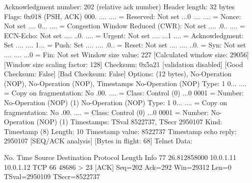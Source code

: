     Acknowledgment number: 202    (relative ack number)
    Header length: 32 bytes
    Flags: 0x018 (PSH, ACK)
        000. .... .... = Reserved: Not set
        ...0 .... .... = Nonce: Not set
        .... 0... .... = Congestion Window Reduced (CWR): Not set
        .... .0.. .... = ECN-Echo: Not set
        .... ..0. .... = Urgent: Not set
        .... ...1 .... = Acknowledgment: Set
        .... .... 1... = Push: Set
        .... .... .0.. = Reset: Not set
        .... .... ..0. = Syn: Not set
        .... .... ...0 = Fin: Not set
    Window size value: 227
    [Calculated window size: 29056]
    [Window size scaling factor: 128]
    Checksum: 0x5a21 [validation disabled]
        [Good Checksum: False]
        [Bad Checksum: False]
    Options: (12 bytes), No-Operation (NOP), No-Operation (NOP), Timestamps
        No-Operation (NOP)
            Type: 1
                0... .... = Copy on fragmentation: No
                .00. .... = Class: Control (0)
                ...0 0001 = Number: No-Operation (NOP) (1)
        No-Operation (NOP)
            Type: 1
                0... .... = Copy on fragmentation: No
                .00. .... = Class: Control (0)
                ...0 0001 = Number: No-Operation (NOP) (1)
        Timestamps: TSval 8522737, TSecr 2950107
            Kind: Timestamp (8)
            Length: 10
            Timestamp value: 8522737
            Timestamp echo reply: 2950107
    [SEQ/ACK analysis]
        [Bytes in flight: 68]
Telnet
    Data: 

No.     Time           Source                Destination           Protocol Length Info
     77 26.812858000   10.0.1.11             10.0.1.12             TCP      66     48686 > 23 [ACK] Seq=202 Ack=292 Win=29312 Len=0 TSval=2950109 TSecr=8522737

